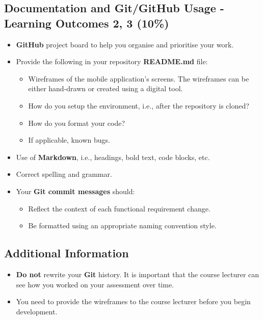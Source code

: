 \documentclass{article}
\begin{document}
\subsection*{Documentation and Git/GitHub Usage - Learning Outcomes 2, 3 (10\%)}
\begin{itemize}
	\item \textbf{GitHub} project board to help you organise and prioritise your work. 
    \item Provide the following in your repository \textbf{README.md} file:
    \begin{itemize} 
      \item Wireframes of the mobile application's screens. The wireframes can be either hand-drawn or created using a digital tool.
	  \item How do you setup the environment, i.e., after the repository is cloned?
      \item How do you format your code?
      \item If applicable, known bugs.
    \end{itemize}
    \item Use of \textbf{Markdown}, i.e., headings, bold text, code blocks, etc.
    \item Correct spelling and grammar.
    \item Your \textbf{Git commit messages} should:
    \begin{itemize}
      \item Reflect the context of each functional requirement change.
      \item Be formatted using an appropriate naming convention style.
    \end{itemize}
\end{itemize}

\subsection*{Additional Information}
\begin{itemize}
	\item \textbf{Do not} rewrite your \textbf{Git} history. It is important that the course lecturer can see how you worked on your assessment over time.
	\item You need to provide the wireframes to the course lecturer before you begin development.
\end{itemize}
\end{document}
